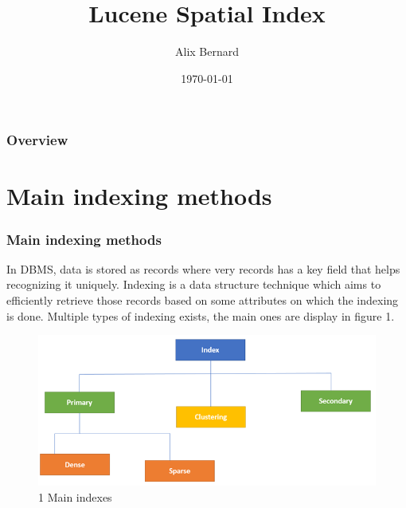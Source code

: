\documentclass{beamer}
\title{Lucene Spatial Index} %
\author{
Alix Bernard
} %
\institute %
\date{\today} %
\begin{document}
\begin{frame}
\titlepage %
\end{frame}

\begin{frame}
\frametitle{Overview} %
\tableofcontents %
\end{frame}


\section{Main indexing methods} %


\begin{frame}
\frametitle{Main indexing methods}
In DBMS, data is stored as records where very records has a key field that helps recognizing it uniquely. Indexing is a data structure technique which aims to efficiently retrieve those records based on some attributes on which the indexing is done. Multiple types of indexing exists, the main ones are display in figure 1.

\begin{figure}[h]
	\includegraphics[scale=.25]{main_indexes.png}
	\caption{1 Main indexes}
\end{figure}
\end{frame}
\end{document}
